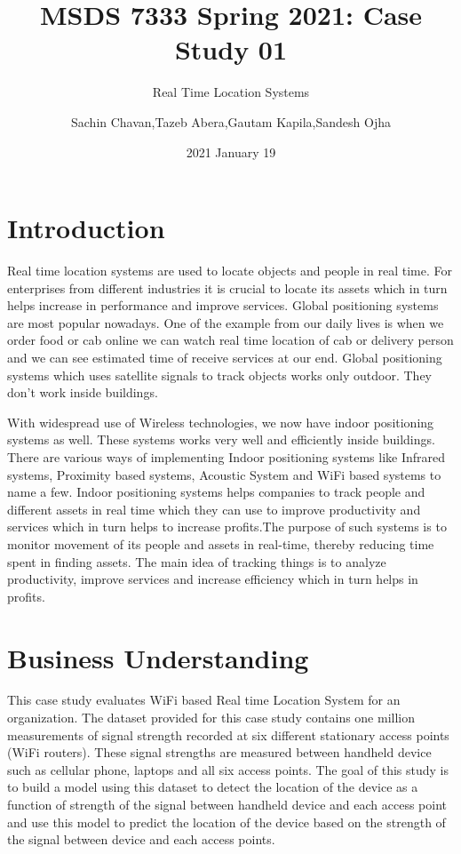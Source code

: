 \documentclass[
]{article}
\title{MSDS 7333 Spring 2021: Case Study 01}
\subtitle{Real Time Location Systems}
\author{Sachin Chavan,Tazeb Abera,Gautam Kapila,Sandesh Ojha}
\date{2021 January 19}
\begin{document}
\maketitle

\hypertarget{introduction}{%
\section{Introduction}\label{introduction}}

Real time location systems are used to locate objects and people in real
time. For enterprises from different industries it is crucial to locate
its assets which in turn helps increase in performance and improve
services. Global positioning systems are most popular nowadays. One of
the example from our daily lives is when we order food or cab online we
can watch real time location of cab or delivery person and we can see
estimated time of receive services at our end. Global positioning
systems which uses satellite signals to track objects works only
outdoor. They don't work inside buildings.

With widespread use of Wireless technologies, we now have indoor
positioning systems as well. These systems works very well and
efficiently inside buildings. There are various ways of implementing
Indoor positioning systems like Infrared systems, Proximity based
systems, Acoustic System and WiFi based systems to name a few. Indoor
positioning systems helps companies to track people and different assets
in real time which they can use to improve productivity and services
which in turn helps to increase profits.The purpose of such systems is
to monitor movement of its people and assets in real-time, thereby
reducing time spent in finding assets. The main idea of tracking things
is to analyze productivity, improve services and increase efficiency
which in turn helps in profits.

\hypertarget{business-understanding}{%
\section{Business Understanding}\label{business-understanding}}

This case study evaluates WiFi based Real time Location System for an
organization. The dataset provided for this case study contains one
million measurements of signal strength recorded at six different
stationary access points (WiFi routers). These signal strengths are
measured between handheld device such as cellular phone, laptops and all
six access points. The goal of this study is to build a model using this
dataset to detect the location of the device as a function of strength
of the signal between handheld device and each access point and use this
model to predict the location of the device based on the strength of the
signal between device and each access points.
\end{document}
